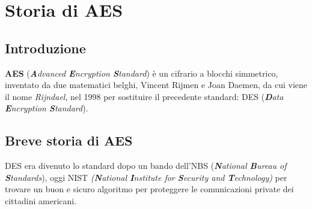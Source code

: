 
\chapter{Storia di AES}





\section{Introduzione}


\textsf{\small \textbf{AES} (\emph{\textbf{A}dvanced \textbf{E}ncryption \textbf{S}tandard}) è un cifrario a blocchi simmetrico, inventato da due matematici belghi, Vincent Rijmen e Joan Daemen, da cui viene il nome \emph{Rijndael}, nel 1998 per sostituire il precedente standard: DES (\emph{\textbf{D}ata \textbf{E}ncryption \textbf{S}tandard}).}




\section{Breve storia di AES} 


\textsf{\small DES era divenuto lo standard dopo un bando dell'NBS (\emph{\textbf{N}ational \textbf{B}ureau of \textbf{S}tandards}), oggi NIST \emph{(\textbf{N}ational \textbf{I}nstitute for \textbf{S}ecurity and \textbf{T}echnology)} per trovare un buon e sicuro algoritmo per proteggere le comunicazioni private dei cittadini americani.}

